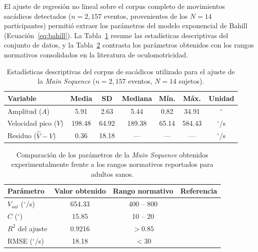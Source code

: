 El ajuste de regresión no lineal sobre el corpus completo de movimientos sacádicos detectados ($n = 2{,}157$ eventos, provenientes de los $N = 14$ participantes) permitió extraer los parámetros del modelo exponencial de Bahill (Ecuación~\ref{eq:bahill}).
La Tabla~\ref{tab:datos_descriptivos} resume las estadísticas descriptivas del conjunto de datos, y la Tabla~\ref{tab:mainseq_vs_literatura} contrasta los parámetros obtenidos con los rangos normativos consolidados en la literatura de oculomotricidad.
\begin{table}[h!]
	\centering
	\caption[Estadísticas descriptivas del corpus de sacádicos ($n=2{,}157$, $N=14$).]{Estadísticas descriptivas del corpus de sacádicos utilizado para el ajuste de la \textit{Main Sequence} ($n = 2{,}157$ eventos, $N = 14$ sujetos).}
	\label{tab:datos_descriptivos}
	\vspace{0.2cm}
	\begin{tabular}{lcccccc}
		\toprule
		\textbf{Variable} & \textbf{Media} & \textbf{SD} & \textbf{Mediana} & \textbf{Mín.} & \textbf{Máx.} & \textbf{Unidad} \\
		\midrule
		Amplitud ($A$)        & 5.91  & 2.63  & 5.44  & 0.82  & 34.91 & $^\circ$ \\
		Velocidad pico ($V$)  & 198.48 & 64.92 & 189.38 & 65.14 & 584.43 & $^\circ$/s \\
		Residuo ($\hat{V}-V$) & 0.36  & 18.18 & ---  
		& ---   & ---   & $^\circ$/s \\
		\bottomrule
	\end{tabular}
\end{table}

\begin{table}[h!]
	\centering
	\caption[Parámetros de la \textit{Main Sequence} vs. rangos normativos.]{Comparación de los parámetros de la \textit{Main Sequence} obtenidos experimentalmente frente a los rangos normativos reportados para adultos sanos.}
	\label{tab:mainseq_vs_literatura}
	\vspace{0.2cm}
	\begin{tabular}{lccc}
		\toprule
		\textbf{Parámetro} & \textbf{Valor obtenido} & \textbf{Rango normativo} & \textbf{Referencia} \\
		\midrule
		$V_{sat}$ ($^\circ$/s) & 654.33 & 400 -- 800 & \cite{bahill1975, leigh2015neurology, collewijn1988binocular} \\
		$C$ ($^\circ$)          & 15.85  & 10 -- 20   & \cite{bahill1975, vanopstal1987skewness} \\
		$R^2$ del ajuste        & 0.9216 & 
		$> 0.85$   & \cite{holmqvist2011eye} \\
		RMSE ($^\circ$/s)       & 18.18  & $< 30$     & \cite{leigh2015neurology} \\
		\bottomrule
	\end{tabular}
\end{table}

